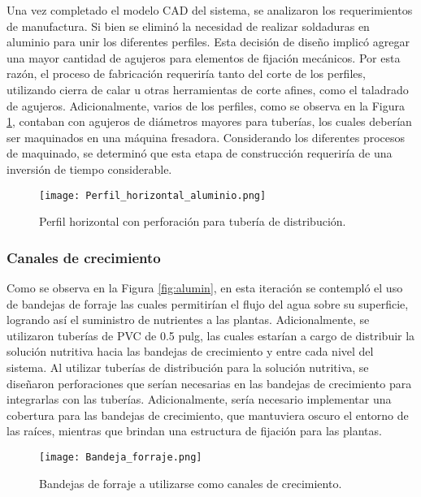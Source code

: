 Una vez completado el modelo CAD del sistema, se analizaron los requerimientos de manufactura. Si bien se eliminó la necesidad de realizar soldaduras en aluminio para unir los diferentes perfiles. Esta decisión de diseño implicó agregar una mayor cantidad de agujeros para elementos de fijación mecánicos. Por esta razón, el proceso de fabricación requeriría tanto del corte de los perfiles, utilizando cierra de calar u otras herramientas de corte afines, como el taladrado de agujeros. Adicionalmente, varios de los perfiles, como se observa en la Figura \ref{fig:perfil_h}, contaban con agujeros de diámetros mayores para tuberías, los cuales deberían ser maquinados en una máquina fresadora. Considerando los diferentes procesos de maquinado, se determinó que esta etapa de construcción requeriría de una inversión de tiempo considerable.

\begin{figure}[H]
	\centering
	\texttt{[image: Perfil\_horizontal\_aluminio.png]}
	\caption{Perfil horizontal con perforación para tubería de distribución.}
	\label{fig:perfil_h}
\end{figure}
\newpage
\subsubsection{Canales de crecimiento}

Como se observa en la Figura \ref{fig:alumin}, en esta iteración se contempló el uso de bandejas de forraje las cuales permitirían el flujo del agua sobre su superficie, logrando así el suministro de nutrientes a las plantas. Adicionalmente, se utilizaron tuberías de PVC de 0.5 pulg, las cuales estarían a cargo de distribuir la solución nutritiva hacia las bandejas de crecimiento y entre cada nivel del sistema. Al utilizar tuberías de distribución para la solución nutritiva, se diseñaron perforaciones que serían necesarias en las bandejas de crecimiento para integrarlas con las tuberías. Adicionalmente, sería necesario implementar una cobertura para las bandejas de crecimiento, que mantuviera oscuro el entorno de las raíces, mientras que brindan una estructura de fijación para las plantas.

\begin{figure}[H]
	\centering
	\texttt{[image: Bandeja\_forraje.png]}
	\caption{Bandejas de forraje a utilizarse como canales de crecimiento.}
	\label{fig:bandeja_forraje}
\end{figure}

